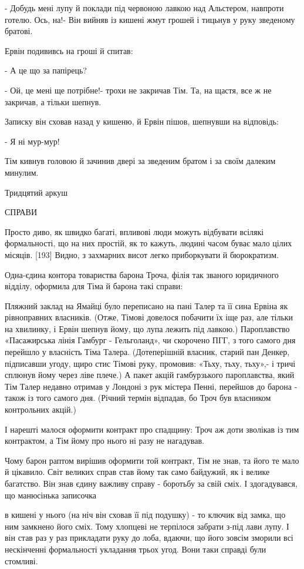 - Добудь мені лупу й поклади під червоною лавкою над Альстером, навпроти готелю. Ось, на!- Він вийняв із кишені жмут грошей і тицьнув у руку зведеному братові.

Ервін подививсь на гроші й спитав:

- А це що за папірець?

- Ой, це мені ще потрібне!- трохи не закричав Тім. Та, на щастя, все ж не закричав, а тільки шепнув.

Записку він сховав назад у кишеню, й Ервін пішов, шепнувши на відповідь:

- Я ні мур-мур!

Тім кивнув головою й зачинив двері за зведеним братом і за своїм далеким минулим.

Тридцятий аркуш

СПРАВИ

Просто диво, як швидко багаті, впливові люди можуть відбувати всілякі формальності, що на них простій, як то кажуть, людині часом буває мало цілих місяців. [193] Видно, з захмарних висот легко приборкувати й бюрократизм.

Одна-єдина контора товариства барона Троча, філія так званого юридичного відділу, оформила для Тіма й барона такі справи:

Пляжний заклад на Ямайці було переписано на пані Талер та її сина Ервіна як рівноправних власників. (Отже, Тімові довелося побачити їх іще раз, але тільки на хвилинку, і Ервін шепнув йому, що лупа лежить під лавкою.) Пароплавство «Пасажирська лінія Гамбург - Гельголанд», чи скорочено ПГГ, з того самого дня перейшло у власність Тіма Талера. (Дотеперішній власник, старий пан Денкер, підписавши угоду, щиро стис Тімові руку, промовив: «Тьху, тьху, тьху»,- і тричі сплюнув йому через ліве плече.) А пакет акцій гамбурзького пароплавства, який Тім Талер недавно отримав у Лондоні з рук містера Пенні, перейшов до барона - також із того самого дня. (Річний термін відпадав, бо Троч був власником контрольних акцій.)

І нарешті малося оформити контракт про спадщину: Троч аж доти зволікав із тим контрактом, а Тім йому про нього ні разу не нагадував.

Чому барон раптом вирішив оформити той контракт, Тім не знав, та його те мало й цікавило. Світ великих справ став йому так само байдужий, як і велике багатство. Він знав єдину важливу справу - боротьбу за свій сміх. І здогадувався, що манюсінька записочка

в кишені у нього (на ніч він сховав її під подушку) - то ключик від замка, що ним замкнено його сміх. Тому хлопцеві не терпілося забрати з-під лави лупу. І він став раз у раз прикладати руку до лоба, вдаючи, що його зовсім зморили всі нескінченні формальності укладання трьох угод. Вони таки справді були стомливі.

